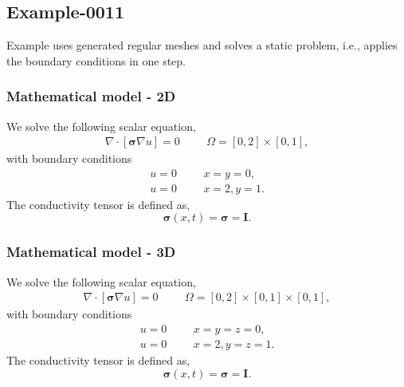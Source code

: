 %
\clearpage
%
\subsection{Example-0011}
%
Example uses generated regular meshes and solves a static problem, i.e., applies
the boundary conditions in one step.
%
%
\subsubsection{Mathematical model - 2D}
%
We solve the following scalar equation,
%
\begin{align}
    \nabla \cdot [\boldsymbol{\sigma} \nabla u] = 0 & &&\Omega = [0, 2] \times [0, 1],
\end{align}
%
with boundary conditions
%
\begin{align}
    u = 0 & &&x = y = 0, \\
    u = 0 & &&x = 2, y = 1.
\end{align}
%
The conductivity tensor is defined as,
%
\begin{equation}
    \boldsymbol{\sigma} (x, t) = \boldsymbol{\sigma} = \boldsymbol{I}.
\end{equation}
%
%
\subsubsection{Mathematical model - 3D}
%
We solve the following scalar equation,
%
\begin{align}
    \nabla \cdot [\boldsymbol{\sigma} \nabla u] = 0 & &&\Omega = [0, 2] \times [0, 1] \times [0, 1],
\end{align}
%
with boundary conditions
%
\begin{align}
    u = 0 & &&x = y = z = 0, \\
    u = 0 & &&x = 2, y = z = 1.
\end{align}
%
The conductivity tensor is defined as,
%
\begin{equation}
    \boldsymbol{\sigma} (x, t) = \boldsymbol{\sigma} = \boldsymbol{I}.
\end{equation}
%
%
